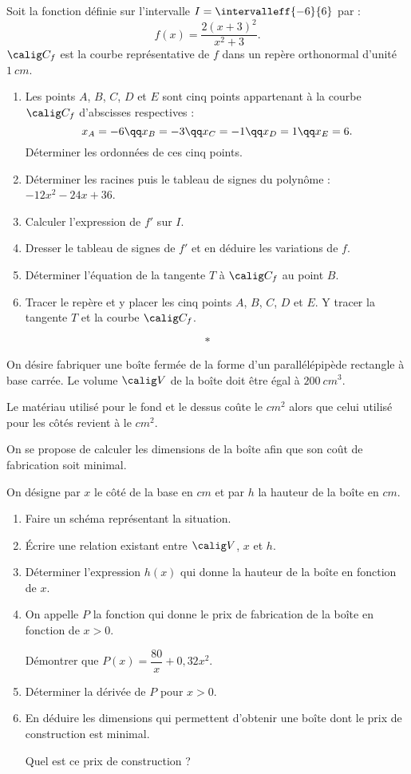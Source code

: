 \documentclass[12pt,openright,twoside,french]{book}
\begin{document}

\exo Soit la fonction définie sur l'intervalle $I = \intervalleff{-6}{6}$ par :
\[f(x) = \dfrac{2(x+3)^2}{x^2 + 3}.\]
$\calig C_f$ est la courbe représentative de $f$ dans un repère orthonormal \Oij{} d'unité $1~cm$.
\begin{enumerate}
    \item Les points $A$, $B$, $C$, $D$ et $E$ sont cinq points appartenant à la courbe $\calig C_f$ d'abscisses respectives :
        \[x_A = -6 \qq x_B = -3 \qq x_C = -1 \qq x_D = 1 \qq x_E = 6.\]
        Déterminer les ordonnées de ces cinq points.
    \item Déterminer les racines puis le tableau de signes du polynôme : $-12x^2 - 24x + 36$.
    \item Calculer l'expression de $f'$ sur $I$.
    \item Dresser le tableau de signes de $f'$ et en déduire les variations de $f$.
    \item Déterminer l'équation de la tangente $T$ à $\calig C_f$ au point $B$.
    \item Tracer le repère \Oij et y placer les cinq points $A$, $B$, $C$, $D$ et $E$. Y tracer la tangente $T$ et la courbe $\calig C_f$.
\end{enumerate}\[*\]

\exo On désire fabriquer une boîte fermée de la forme d'un parallélépipède rectangle à base carrée.
Le volume $\calig V$ de la boîte doit être égal à $200~cm^3$.\par
Le matériau utilisé pour le fond et le dessus coûte  le $cm^2$ alors que celui utilisé pour les côtés revient à  le $cm^2$.\par
On se propose de calculer les dimensions de la boîte afin que son coût de fabrication soit minimal.\par
On désigne par $x$ le côté de la base en $cm$ et par $h$ la hauteur de la boîte en $cm$.

\begin{enumerate}
    \item Faire un schéma représentant la situation.
    \item \'Ecrire une relation existant entre $\calig V$, $x$ et $h$.
    \item Déterminer l'expression $h(x)$ qui donne la hauteur de la boîte en fonction de $x$.
    \item On appelle $P$ la fonction qui donne le prix de fabrication de la boîte en fonction de $x > 0$.\par
    Démontrer que $P(x) = \dfrac{80}{x} + 0,32 x^2$.
    \item Déterminer la dérivée de $P$ pour $x > 0$.
    \item En déduire les dimensions qui permettent d'obtenir une boîte dont le prix de construction est minimal.\par
    Quel est ce prix de construction ?
\end{enumerate}
\end{document}
